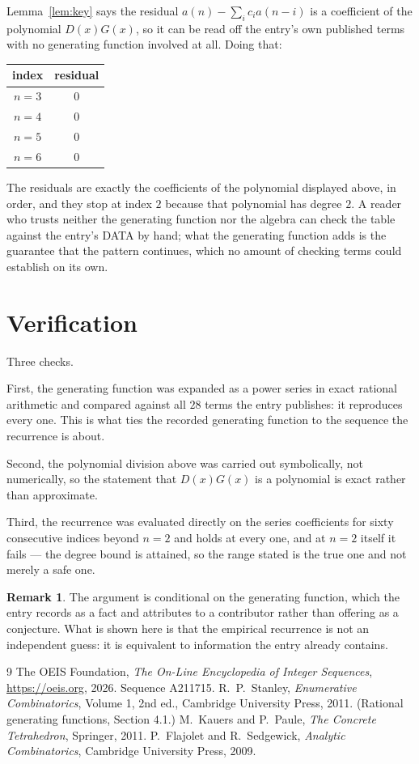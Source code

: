 \documentclass[11pt,a4paper]{article}
\theoremstyle{plain}
\theoremstyle{definition}
\newtheorem{remark}[theorem]{Remark}
\begin{document}
Lemma~\ref{lem:key} says the residual $a(n)-\sum_ic_ia(n-i)$ is a coefficient of the
polynomial $D(x)G(x)$, so it can be read off the entry's own published terms with no
generating function involved at all. Doing that:
\begin{center}
\begin{tabular}{cc}
index & residual \\ \hline
$n=3$ & $0$ \\
$n=4$ & $0$ \\
$n=5$ & $0$ \\
$n=6$ & $0$
\end{tabular}
\end{center}
The residuals are exactly the coefficients of the polynomial displayed above, in order, and
they stop at index $2$ because that polynomial has degree $2$. A reader who trusts
neither the generating function nor the algebra can check the table against the entry's DATA
by hand; what the generating function adds is the guarantee that the pattern continues, which
no amount of checking terms could establish on its own.

\section{Verification}

Three checks.

First, the generating function was expanded as a power series in exact rational arithmetic and
compared against all $28$ terms the entry publishes: it reproduces every one. This is
what ties the recorded generating function to the sequence the recurrence is about.

Second, the polynomial division above was carried out symbolically, not numerically, so the
statement that $D(x)G(x)$ is a polynomial is exact rather than approximate.

Third, the recurrence was evaluated directly on the series coefficients for sixty consecutive
indices beyond $n=2$ and holds at every one, and at $n=2$ itself it fails --- the
degree bound is attained, so the range stated is the true one and not merely a safe one.

\begin{remark}
The argument is conditional on the generating function, which the entry records as a fact and
attributes to a contributor rather than offering as a conjecture. What is shown here is that
the empirical recurrence is not an independent guess: it is equivalent to information the
entry already contains.
\end{remark}

\begin{thebibliography}{9}
 The OEIS Foundation, \emph{The On-Line Encyclopedia of Integer
Sequences}, \url{https://oeis.org}, 2026. Sequence A211715.
 R.~P.~Stanley, \emph{Enumerative Combinatorics}, Volume 1, 2nd ed.,
Cambridge University Press, 2011. (Rational generating functions, Section 4.1.)
 M.~Kauers and P.~Paule, \emph{The Concrete Tetrahedron}, Springer, 2011.
 P.~Flajolet and R.~Sedgewick, \emph{Analytic Combinatorics}, Cambridge
University Press, 2009.
\end{thebibliography}
\end{document}
